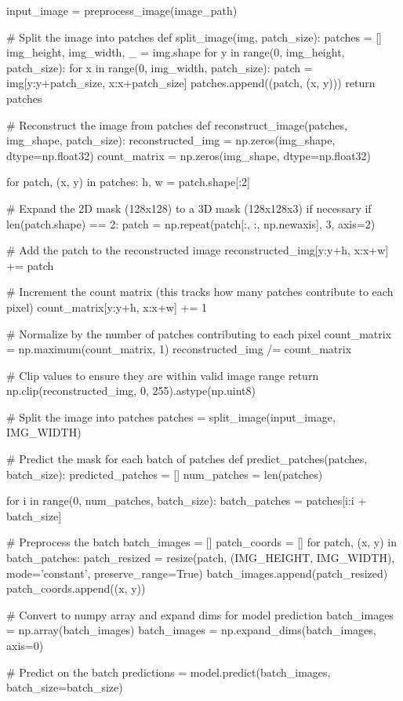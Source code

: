 \documentclass[conference]{IEEEtran}
\begin{document}
input_image = preprocess_image(image_path)

# Split the image into patches
def split_image(img, patch_size):
patches = []
img_height, img_width, _ = img.shape
for y in range(0, img_height, patch_size):
for x in range(0, img_width, patch_size):
patch = img[y:y+patch_size, x:x+patch_size]
patches.append((patch, (x, y)))
return patches

# Reconstruct the image from patches
def reconstruct_image(patches, img_shape, patch_size):
reconstructed_img = np.zeros(img_shape, dtype=np.float32)
count_matrix = np.zeros(img_shape, dtype=np.float32)

for patch, (x, y) in patches:
h, w = patch.shape[:2]

# Expand the 2D mask (128x128) to a 3D mask (128x128x3) if necessary
if len(patch.shape) == 2:
patch = np.repeat(patch[:, :, np.newaxis], 3, axis=2)

# Add the patch to the reconstructed image
reconstructed_img[y:y+h, x:x+w] += patch

# Increment the count matrix (this tracks how many patches contribute to each pixel)
count_matrix[y:y+h, x:x+w] += 1

# Normalize by the number of patches contributing to each pixel
count_matrix = np.maximum(count_matrix, 1)
reconstructed_img /= count_matrix

# Clip values to ensure they are within valid image range
return np.clip(reconstructed_img, 0, 255).astype(np.uint8)

# Split the image into patches
patches = split_image(input_image, IMG_WIDTH)

# Predict the mask for each batch of patches
def predict_patches(patches, batch_size):
predicted_patches = []
num_patches = len(patches)

for i in range(0, num_patches, batch_size):
batch_patches = patches[i:i + batch_size]

# Preprocess the batch
batch_images = []
patch_coords = []
for patch, (x, y) in batch_patches:
patch_resized = resize(patch, (IMG_HEIGHT, IMG_WIDTH), mode='constant', preserve_range=True)
batch_images.append(patch_resized)
patch_coords.append((x, y))

# Convert to numpy array and expand dims for model prediction
batch_images = np.array(batch_images)
batch_images = np.expand_dims(batch_images, axis=0)

# Predict on the batch
predictions = model.predict(batch_images, batch_size=batch_size)
\end{document}
